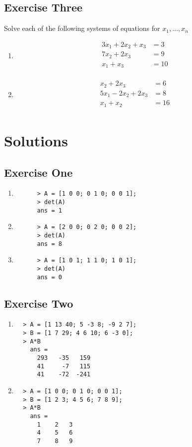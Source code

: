 \documentclass{article}
\begin{document}
\subsection{Exercise Three}
Solve each of the following systems of equations for $x_1, \ldots ,x_n$
\begin{enumerate}
\item
  \begin{align*}
    3x_1 + 2x_2 + x_3 &= 3 \\
           7x_2 + 2x_3 &= 9 \\
    x_1 + x_3 &= 10 \\
  \end{align*}
\item
  \begin{align*}
           x_2 + 2x_3 &= 6 \\
    5x_1 - 2x_2 + 2x_3 &= 8 \\
    x_1 + x_2 &= 16 \\
  \end{align*}
\end{enumerate}
\newpage{}
\section{Solutions}
\subsection{Exercise One}
\begin{enumerate}
  \item 
    \begin{verbatim}
      > A = [1 0 0; 0 1 0; 0 0 1];
      > det(A)
      ans = 1
    \end{verbatim}
  \item
    \begin{verbatim}
      > A = [2 0 0; 0 2 0; 0 0 2];
      > det(A)
      ans = 8
    \end{verbatim}
  \item
    \begin{verbatim}
      > A = [1 0 1; 1 1 0; 1 0 1];
      > det(A)
      ans = 0
    \end{verbatim}
\end{enumerate}
\subsection{Exercise Two}

\begin{enumerate}
  \item
  \begin{verbatim}
  > A = [1 13 40; 5 -3 8; -9 2 7];
  > B = [1 7 29; 4 6 10; 6 -3 0];
  > A*B
    ans =    
      293   -35   159
      41     -7   115
      41    -72  -241
  \end{verbatim}
  \item
      \begin{verbatim}
  > A = [1 0 0; 0 1 0; 0 0 1];
  > B = [1 2 3; 4 5 6; 7 8 9];
  > A*B
    ans =    
      1    2   3
      4    5   6
      7    8   9
  \end{verbatim}
\end{enumerate}
\end{document}
